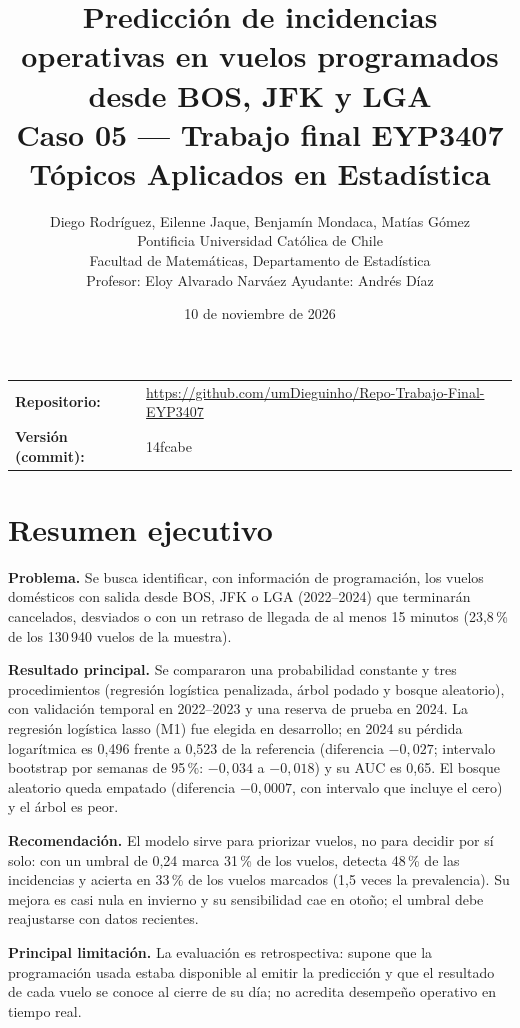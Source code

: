 \documentclass[11pt,a4paper]{article}
\title{\textbf{Predicción de incidencias operativas en vuelos programados desde BOS, JFK y LGA}\\[2pt]
\large Caso 05 --- Trabajo final EYP3407 Tópicos Aplicados en Estadística}
\author{Diego Rodríguez, Eilenne Jaque, Benjamín Mondaca, Matías Gómez\\[4pt]
Pontificia Universidad Católica de Chile\\
Facultad de Matemáticas, Departamento de Estadística\\
Profesor: Eloy Alvarado Narváez \quad Ayudante: Andrés Díaz}
\date{10 de noviembre de 2026}
\begin{document}
 
\maketitle
\thispagestyle{empty}
 
\begin{center}
\begin{tabular}{@{}lp{11cm}@{}}
\textbf{Repositorio:} & \url{https://github.com/umDieguinho/Repo-Trabajo-Final-EYP3407}\\
\textbf{Versión (commit):} & 14fcabe
\end{tabular}
\end{center}
 
\newpage
\tableofcontents
\newpage
 
\section{Resumen ejecutivo}
\textbf{Problema.} Se busca identificar, con información de programación, los vuelos domésticos con salida desde BOS, JFK o LGA (2022--2024) que terminarán cancelados, desviados o con un retraso de llegada de al menos 15 minutos (23,8\,\% de los 130\,940 vuelos de la muestra).
 
\textbf{Resultado principal.} Se compararon una probabilidad constante y tres procedimientos (regresión logística penalizada, árbol podado y bosque aleatorio), con validación temporal en 2022--2023 y una reserva de prueba en 2024. La regresión logística lasso (M1) fue elegida en desarrollo; en 2024 su pérdida logarítmica es 0,496 frente a 0,523 de la referencia (diferencia $-0{,}027$; intervalo bootstrap por semanas de 95\,\%: $-0{,}034$ a $-0{,}018$) y su AUC es 0,65. El bosque aleatorio queda empatado (diferencia $-0{,}0007$, con intervalo que incluye el cero) y el árbol es peor.
 
\textbf{Recomendación.} El modelo sirve para priorizar vuelos, no para decidir por sí solo: con un umbral de 0,24 marca 31\,\% de los vuelos, detecta 48\,\% de las incidencias y acierta en 33\,\% de los vuelos marcados (1,5 veces la prevalencia). Su mejora es casi nula en invierno y su sensibilidad cae en otoño; el umbral debe reajustarse con datos recientes.
 
\textbf{Principal limitación.} La evaluación es retrospectiva: supone que la programación usada estaba disponible al emitir la predicción y que el resultado de cada vuelo se conoce al cierre de su día; no acredita desempeño operativo en tiempo real.
 
\end{document}
